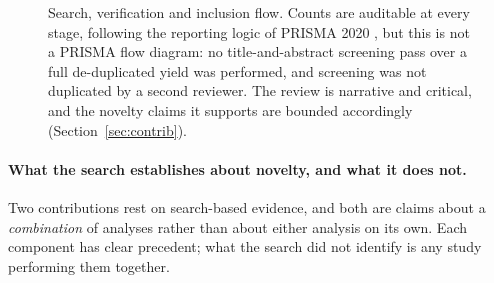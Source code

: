 \begin{figure}[H]
\caption{Search, verification and inclusion flow. Counts are auditable at every
  stage, following the reporting logic of PRISMA 2020 \cite{page2021prisma},
  but this is not a PRISMA flow diagram: no title-and-abstract screening pass
  over a full de-duplicated yield was performed, and screening was not
  duplicated by a second reviewer. The review is narrative and critical, and
  the novelty claims it supports are bounded accordingly
  (Section~\ref{sec:contrib}).}
\label{fig:prisma}
\end{figure}

\paragraph{What the search establishes about novelty, and what it does not.}
Two contributions rest on search-based evidence, and both are claims about a
\emph{combination} of analyses rather than about either analysis on its own.
Each component has clear precedent; what the search did not identify is any
study performing them together.

